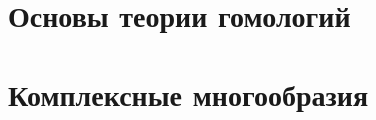 \documentclass[dvipsnames, 11pt]{article}
\begin{document}
    \tableofcontents

    \section{Основы теории гомологий}

    
    
    
    
    
    
    
    



    \newpage
    \section{Комплексные многообразия}
    
    
\end{document}
